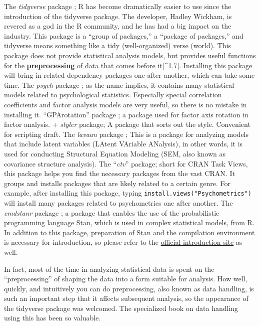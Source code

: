 \documentclass[
  a4paper,
]{book}
\begin{document}
The \emph{tidyverse} package \autocite{tidyverse}; R has become
dramatically easier to use since the introduction of the tidyverse
package. The developer, Hadley Wickham, is revered as a god in the R
community, and he has had a big impact on the industry. This package is
a ``group of packages,'' a ``package of packages,'' and tidyverse means
something like a tidy (well-organized) verse (world). This package does
not provide statistical analysis models, but provides useful functions
for the \textbf{preprocessing} of data that comes before
it{[}\^{}1.7{]}. Installing this package will bring in related
dependency packages one after another, which can take some time. The
\emph{psych} package \autocite{psych}; as the name implies, it contains
many statistical models related to psychological statistics. Especially
special correlation coefficients and factor analysis models are very
useful, so there is no mistake in installing it. ``GPArotation'' package
\autocite{GPArotation}; a package used for factor axis rotation in
factor analysis. + \emph{styler} package; A package that sorts out the
style. Convenient for scripting draft. The \emph{lavaan} package
\autocite{lavaan}; This is a package for analyzing models that include
latent variables (LAtent VAriable ANalysis), in other words, it is used
for conducting Structural Equation Modeling (SEM, also known as
covariance structure analysis). The ``\emph{ctv}''
package\autocite{CTV}; short for CRAN Task Views, this package helps you
find the necessary packages from the vast CRAN. It groups and installs
packages that are likely related to a certain genre. For example, after
installing this package, typing \texttt{install.views("Psychometrics")}
will install many packages related to psychometrics one after another.
The \emph{cmdstanr} package \autocite{cmdstanr}; a package that enables
the use of the probabilistic programming language Stan, which is used in
complex statistical models, from R. In addition to this package,
preparation of Stan and the compilation environment is necessary for
introduction, so please refer to the
\href{https://mc-stan.org/cmdstanr/articles/cmdstanr.html}{official
introduction site} as well.

In fact, most of the time in analyzing statistical data is spent on the
``preprocessing'' of shaping the data into a form suitable for analysis.
How well, quickly, and intuitively you can do preprocessing, also known
as data handling, is such an important step that it affects subsequent
analysis, so the appearance of the tidyverse package was welcomed. The
specialized book \textcite{Kinosady2021} on data handling using this has
been so valuable.
\end{document}
